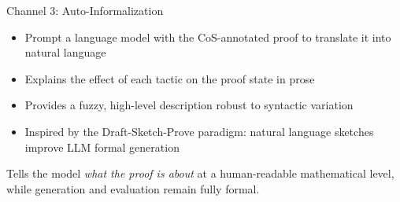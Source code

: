 \documentclass{beamer}
\begin{document}
\begin{frame}{Channel 3: Auto-Informalization}
\vspace{0.4em}
\begin{itemize}\setlength{\itemsep}{8pt}
  \item Prompt a language model with the CoS-annotated proof to translate it into natural language
  \item Explains the effect of each tactic on the proof state in prose
  \item Provides a fuzzy, high-level description robust to syntactic variation
  \item Inspired by the Draft-Sketch-Prove paradigm: natural language sketches improve LLM formal generation
\end{itemize}
\vspace{0.4em}
\begin{exampleblock}{}
  Tells the model \emph{what the proof is about} at a human-readable mathematical level, while generation and evaluation remain fully formal.
\end{exampleblock}
\end{frame}
\end{document}
